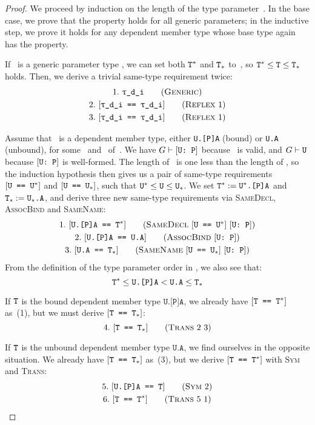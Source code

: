 \documentclass[../generics]{subfiles}
\begin{document}
\begin{proof}
We proceed by induction on the length of the type parameter~\tT. In the base case, we prove that the property holds for all generic parameters; in the inductive step, we prove it holds for any dependent member type whose base type again has the property.

\BaseCase If \tT\ is a generic parameter type , we can set both $\texttt{T}^*$ and $\texttt{T}_*$ to~\tT, so $\texttt{T}^*\le\texttt{T}\le\texttt{T}_*$ holds. Then, we derive a trivial same-type requirement twice:
\begin{gather*}
\GenericStep{\ttgp{d}{i}}{1}\\
\ReflexStep{1}{\ttgp{d}{i}}{2}\\
\ReflexStep{1}{\ttgp{d}{i}}{3}
\end{gather*}

\InductiveStep Assume that \tT\ is a dependent member type, either \texttt{U.[P]A} (bound) or \texttt{U.A} (unbound), for some \tU\ and \nA\ of~\tP. We have $G\vdash[\texttt{U:~P}]$ because \tT\ is valid, and $G\vdash\texttt{U}$ because $[\texttt{U:~P}]$ is well-formed. The length of \tU\ is one less than the length of \tT, so the induction hypothesis then gives us a pair of same-type requirements $[\texttt{U == $\texttt{U}^*$}]$ and $[\texttt{U == $\texttt{U}_*$}]$, such that $\texttt{U}^*\le\texttt{U}\le\texttt{U}_*$. We set $\texttt{T}^*:=\texttt{U}^*\texttt{.[P]A}$ and $\texttt{T}_*:=\texttt{U}_*\texttt{.A}$, and derive three new same-type requirements via \textsc{SameDecl}, \textsc{AssocBind} and \textsc{SameName}:
\begin{gather*}
\SameDeclStep{$\SameReq{U}{$\tU^*$}$}{$\ConfReq{U}{P}$}{U.[P]A}{$\tT^*$}{1}\\
\AssocBindStep{$\ConfReq{U}{P}$}{U.[P]A}{U.A}{2}\\
\SameNameStep{$\SameReq{U}{$\tU_*$}$}{$\ConfReq{U}{P}$}{U.A}{$\tT_*$}{3}
\end{gather*}
From the definition of the type parameter order in , we also see that:
\[\texttt{T}^*\le\texttt{U.[P]A}<\texttt{U.A}\le\texttt{T}_*\]

If $\texttt{T}$ is the bound dependent member type $\texttt{U.[P]A}$, we already have $[\texttt{T == $\texttt{T}^*$}]$ as~(1), but we must derive $[\texttt{T == $\texttt{T}_*$}]$:
\[
\TransStep{2}{3}{T}{$\tT_*$}{4}
\]

If $\texttt{T}$ is the unbound dependent member type $\texttt{U.A}$, we find ourselves in the opposite situation. We already have $[\texttt{T == $\texttt{T}_*$}]$ as~(3), but we derive $[\texttt{T == $\texttt{T}^*$}]$ with \textsc{Sym} and \textsc{Trans}:
\begin{gather*}
\SymStep{2}{U.[P]A}{T}{5}\\
\TransStep{5}{1}{T}{$\tT^*$}{6}
\end{gather*}


\end{proof}
\end{document}
